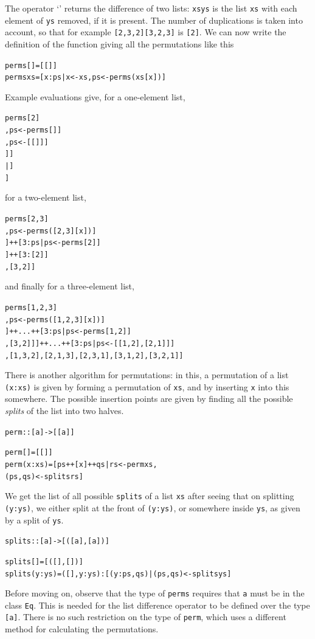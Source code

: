 The operator `\texttt{\bs{}\bs{}}' returns the difference of
two lists: \texttt{xs\bs{}\bs{}ys} is the list \texttt{xs} with each element of \texttt{ys}
removed, if it is present. The number of duplications is taken into account, so that for  example \texttt{[2,3,2]\bs{}\bs{}[3,2,3]} is \texttt{[2]}. We can now write the definition of the function giving all the permutations like this
\begin{alltt}
perms [] = [[]]
perms xs = [ x:ps | x <- xs , ps <- perms (xs\bs{}\bs{}[x]) ]
\end{alltt}
Example evaluations give, for a one-element list,
\begin{alltt}
perms [2]
\step [x:ps| x <- [2] , ps <- perms [] ] 
\step [x:ps| x <- [2] , ps <- [[]] ] 
\step [2:ps| ps <- [[]] ] 
\step [2:[] | ]
\step [[2]]
\end{alltt}
for a two-element list,
\begin{alltt}
perms [2,3]
\step [ x:ps | x <- [2,3] , ps <- perms([2,3]\bs{}\bs{}[x]) ]
\step [ 2:ps | ps <- perms [3] ] ++ [ 3:ps | ps <- perms [2] ]
\step [ 2:[3] ] ++ [ 3:[2] ]
\step [ [2,3] , [3,2] ]
\end{alltt}
and finally for a three-element list,
\begin{alltt}
perms [1,2,3]
\step [ x:ps | x <- [1,2,3] , ps <- perms([1,2,3]\bs{}\bs{}[x]) ]
\step [ 1:ps | ps <- perms [2,3]] ++...++ [ 3:ps | ps <- perms [1,2]]
\step [ 1:ps | ps<-[[2,3],[3,2]]] ++...++ [ 3:ps | ps<-[[1,2],[2,1]]]
\step [[1,2,3],[1,3,2],[2,1,3],[2,3,1],[3,1,2],[3,2,1]]
\end{alltt}
There is another algorithm for permutations: in this, a permutation of a
list \texttt{(x:xs)} is given by forming a 
permutation of \texttt{xs}, and by inserting \texttt{x} into this somewhere. The
possible insertion points are given by finding all the possible {\em splits\/}
of the list into two halves.
\begin{alltt}
perm :: [a] -> [[a]]

perm []     = [[]]
perm (x:xs) = [ ps++[x]++qs | rs <- perm xs ,
                              (ps,qs) <- splits rs ]
\end{alltt}
We get the list of all possible \texttt{splits} of a list \texttt{xs} after seeing
that on splitting \texttt{(y:ys)}, we either split at the front of \texttt{(y:ys)}, or
somewhere inside \texttt{ys}, as given by a split of \texttt{ys}.
\begin{alltt}
splits :: [a]->[([a],[a])]

splits []     = [ ([],[]) ]
splits (y:ys) = ([],y:ys) : [ (y:ps,qs) | (ps,qs) <- splits ys]
\end{alltt}
Before moving on, observe that the type of \texttt{perms} requires that
\texttt{a} must be in the class \texttt{Eq}.
This is needed for the list difference operator \texttt{\bs{}\bs{}}
to be defined over the type
\texttt{[a]}. There is no such restriction on the type of \texttt{perm}, which
uses a different method for calculating the permutations.


